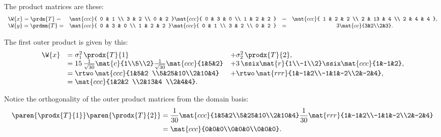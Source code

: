 The product matrices are these:
\begin{equation}
  \begin{array}{lccc}
     \W{x} = \prdm{T}  =& 
  \mat{ccc}
  { 0 & 1 \\
    3 & 2 \\
    0 & 2
  }  
  \mat{ccc}
  {
  0 & 3 & 0 \\
  1 & 2 & 2
  } 
     &=& 
  \mat{ccc}
  {
  1 &  2 & 2 \\
  2 & 13 & 4 \\
  2 &  4 & 4 
  },\\
     \W{y} = \prdmm{T} =& 
  \mat{ccc}
  {
  0 & 3 & 0 \\
  1 & 2 & 2
  }
  \mat{ccc}
  { 0 & 1 \\
    3 & 2 \\
    0 & 2
  }  
   &=& 3 \mat{cc}{3&2\\2&3}.\\
  \end{array}
\end{equation}

The first outer product is given by this:
\begin{equation}
  \begin{array}{rll}
     \W{x} &= \sigma_{1}^{2}\, \prodx{T}{1} &+ \sigma_{2}^{2}\, \prodx{T}{2},\\
      &= 15\,\frac{1}{\sqrt{30}}\mat{c}{1\\5\\2}\frac{1}{\sqrt{30}}\mat{ccc}{1&5&2}
      &+ 3\,\ssix\mat{r}{1\\-1\\2}\ssix\mat{ccc}{1&-1&2},\\
      &= \rtwo\,\mat{ccc}{1&5&2 \\5&25&10\\2&10&4}
      &+ \rtwo\,\mat{rrr}{1&-1&2\\-1&1&-2\\2&-2&4},\\
      &=        \mat{ccc}{1&2&2 \\2&13&4 \\2&4&4}.
  \end{array}
\end{equation}

Notice the orthogonality of the outer product matrices from the domain basis:
\begin{equation}
  \begin{split}
     \paren{\prodx{T}{1}} \paren{\prodx{T}{2}} &=
     \frac{1}{30}\mat{ccc}{1&5&2\\5&25&10\\2&10&4}
     \frac{1}{30}\mat{rrr}{1&-1&2\\-1&1&-2\\2&-2&4} \\
     & = \mat{ccc}{0&0&0\\0&0&0\\0&0&0}.
  \end{split}
\end{equation}

